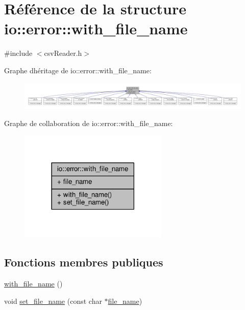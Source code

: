 \hypertarget{structio_1_1error_1_1with__file__name}{}\section{Référence de la structure io\+:\+:error\+:\+:with\+\_\+file\+\_\+name}
\label{structio_1_1error_1_1with__file__name}


{\ttfamily \#include $<$csv\+Reader.\+h$>$}



Graphe d\textquotesingle{}héritage de io\+:\+:error\+:\+:with\+\_\+file\+\_\+name\+:\nopagebreak
\begin{figure}[H]
\begin{center}
\leavevmode
\includegraphics[width=350pt]{structio_1_1error_1_1with__file__name__inherit__graph}
\end{center}
\end{figure}


Graphe de collaboration de io\+:\+:error\+:\+:with\+\_\+file\+\_\+name\+:\nopagebreak
\begin{figure}[H]
\begin{center}
\leavevmode
\includegraphics[width=201pt]{structio_1_1error_1_1with__file__name__coll__graph}
\end{center}
\end{figure}
\subsection*{Fonctions membres publiques}
\begin{DoxyCompactItemize}
\item 
\hyperlink{structio_1_1error_1_1with__file__name_aeb0eced36b022e8a00b19727d833067f}{with\+\_\+file\+\_\+name} ()
\item 
void \hyperlink{structio_1_1error_1_1with__file__name_ae765de62778c989d4658b4efe2995390}{set\+\_\+file\+\_\+name} (const char $\ast$\hyperlink{structio_1_1error_1_1with__file__name_ac957d5590a8b95517b74eb5bf373a424}{file\+\_\+name})
\end{DoxyCompactItemize}
